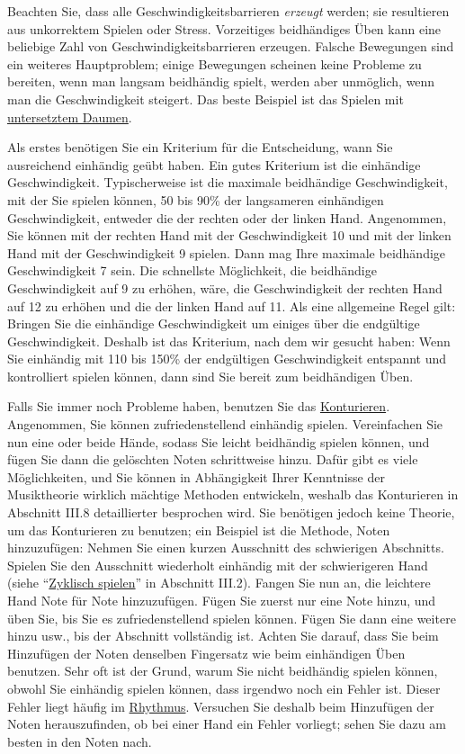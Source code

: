 Beachten Sie, dass alle Geschwindigkeitsbarrieren \textit{erzeugt} werden; sie resultieren aus unkorrektem Spielen oder Stress.
Vorzeitiges beidhändiges Üben kann eine beliebige Zahl von Geschwindigkeitsbarrieren erzeugen.
Falsche Bewegungen sind ein weiteres Hauptproblem; einige Bewegungen scheinen keine Probleme zu bereiten, wenn man langsam beidhändig spielt, werden aber unmöglich, wenn man die Geschwindigkeit steigert.
Das beste Beispiel ist das Spielen mit \hyperref[c1iii5a]{untersetztem Daumen}.

Als erstes benötigen Sie ein Kriterium für die Entscheidung, wann Sie ausreichend einhändig geübt haben.
Ein gutes Kriterium ist die einhändige Geschwindigkeit.
Typischerweise ist die maximale beidhändige Geschwindigkeit, mit der Sie spielen können, 50 bis 90\% der langsameren einhändigen Geschwindigkeit, entweder die der rechten oder der linken Hand.
Angenommen, Sie können mit der rechten Hand mit der Geschwindigkeit 10 und mit der linken Hand mit der Geschwindigkeit 9 spielen.
Dann mag Ihre maximale beidhändige Geschwindigkeit 7 sein.
Die schnellste Möglichkeit, die beidhändige Geschwindigkeit auf 9 zu erhöhen, wäre, die Geschwindigkeit der rechten Hand auf 12 zu erhöhen und die der linken Hand auf 11.
Als eine allgemeine Regel gilt: Bringen Sie die einhändige Geschwindigkeit um einiges über die endgültige Geschwindigkeit.
Deshalb ist das Kriterium, nach dem wir gesucht haben: Wenn Sie einhändig mit 110 bis 150\% der endgültigen Geschwindigkeit entspannt und kontrolliert spielen können, dann sind Sie bereit zum beidhändigen Üben.


\label{notenweise}

Falls Sie immer noch Probleme haben, benutzen Sie das \hyperref[c1iii8]{Konturieren}.
Angenommen, Sie können zufriedenstellend einhändig spielen.
Vereinfachen Sie nun eine oder beide Hände, sodass Sie leicht beidhändig spielen können, und fügen Sie dann die gelöschten Noten schrittweise hinzu.
Dafür gibt es viele Möglichkeiten, und Sie können in Abhängigkeit Ihrer Kenntnisse der Musiktheorie wirklich mächtige Methoden entwickeln, weshalb das Konturieren in Abschnitt III.8 detaillierter besprochen wird.
Sie benötigen jedoch keine Theorie, um das Konturieren zu benutzen; ein Beispiel ist die Methode, Noten hinzuzufügen: Nehmen Sie einen kurzen Ausschnitt des schwierigen Abschnitts.
Spielen Sie den Ausschnitt wiederholt einhändig mit der schwierigeren Hand (siehe \enquote{\hyperref[c1iii2]{Zyklisch spielen}} in Abschnitt III.2).
Fangen Sie nun an, die leichtere Hand Note für Note hinzuzufügen.
Fügen Sie zuerst nur eine Note hinzu, und üben Sie, bis Sie es zufriedenstellend spielen können.
Fügen Sie dann eine weitere hinzu usw., bis der Abschnitt vollständig ist.
Achten Sie darauf, dass Sie beim Hinzufügen der Noten denselben Fingersatz wie beim einhändigen Üben benutzen.
Sehr oft ist der Grund, warum Sie nicht beidhändig spielen können, obwohl Sie einhändig spielen können, dass irgendwo noch ein Fehler ist.
Dieser Fehler liegt häufig im \hyperref[c1iii1b]{Rhythmus}.
Versuchen Sie deshalb beim Hinzufügen der Noten herauszufinden, ob bei einer Hand ein Fehler vorliegt;
sehen Sie dazu am besten in den Noten nach.

